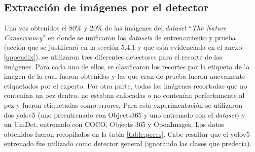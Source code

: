\subsection{Extracción de imágenes por el detector} 
Una vez obtenidos el 80\% y 20\% de las imágenes del \textit{dataset} 
``\textit{The Nature Conservancy}'' en donde se unificaron los \textit{datasets} de entrenamiento 
y prueba (acción que se justificará en la sección 5.4.1 y que está evidenciada en el anexo 
\ref{appendix}). se utilizaron tres diferentes detectores para el recorte de las imágenes. 
Para cada uno de ellos, se clasificaron los recortes por la etiqueta de la imagen de la cual 
fueron obtenidas y las que eran de prueba fueron nuevamente etiquetados por el experto. Por 
otra parte, todas las imágenes recortadas que no contenían un pez dentro, no estaban enfocadas 
o no contenían perfectamente al pez y fueron etiquetadas como errores. Para esta experimentación 
se utilizaron dos yolov5 (uno preentrenado con Objects365 y uno entrenado con el \textit{dataset}) 
y un UniDet, entrenado con COCO, Objects 365 y OpenImages. Los datos obtenidos fueron 
recopilados en la tabla \ref{table:peces}. Cabe resaltar que el yolov5 entrenado fue utilizado 
como detector general (ignorando las clases que predecía).
\\
